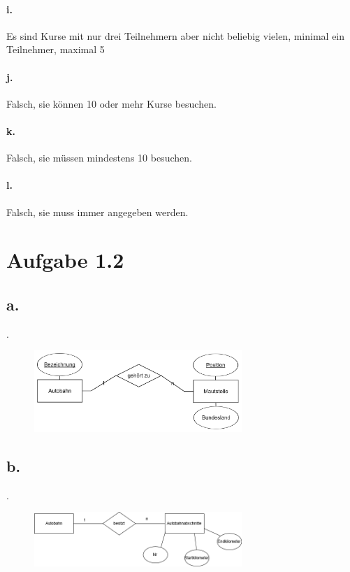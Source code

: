 \documentclass{article}
\begin{document}
		\paragraph*{i.}Es sind Kurse mit nur drei Teilnehmern aber nicht beliebig vielen, minimal ein Teilnehmer, maximal 5
		
		\paragraph*{j.}Falsch, sie können 10 oder mehr Kurse besuchen.
		
		\paragraph*{k.}Falsch, sie müssen mindestens 10 besuchen.
		
		\paragraph*{l.}Falsch, sie muss immer angegeben werden.
		
	\section*{Aufgabe 1.2}
		\subsection*{a.}
		.
			\begin{figure}[h]
				\includegraphics[width=0.7\textwidth]{aufgabe_1_2_a.png}
			\end{figure}
		
		\subsection*{b.}
		.
			\begin{figure}[h]
				\includegraphics[width=0.7\textwidth]{aufgabe_1_2_b.png}
			\end{figure}
		
\end{document}
